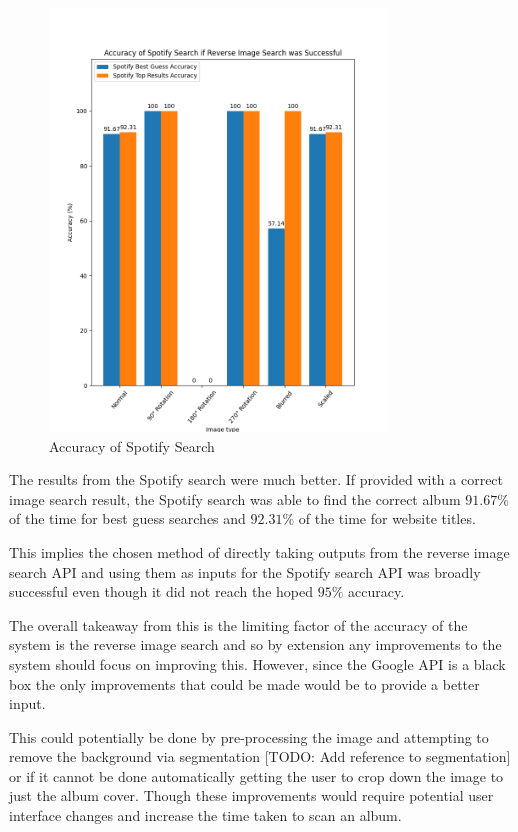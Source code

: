 \begin{figure} [H]
    \centering
    \includegraphics[width=0.8\textwidth]{figures/evaluation_graphs_spotify.png}
    \caption{Accuracy of Spotify Search}
    \label{fig:album-scanning-results-spotify}
\end{figure}

The results from the Spotify search were much better. If provided with a correct image search result, the Spotify search was able to find the correct album $91.67\%$ of the time for best guess searches and $92.31\%$ of the time for website titles.

This implies the chosen method of directly taking outputs from the reverse image search API and using them as inputs for the Spotify search API was broadly successful even though it did not reach the hoped $95\%$ accuracy.

The overall takeaway from this is the limiting factor of the accuracy of the system is the reverse image search and so by extension any improvements to the system should focus on improving this. However, since the Google API is a black box the only improvements that could be made would be to provide a better input.

This could potentially be done by pre-processing the image and attempting to remove the background via segmentation [TODO: Add reference to segmentation] or if it cannot be done automatically getting the user to crop down the image to just the album cover. Though these improvements would require potential user interface changes and increase the time taken to scan an album.


